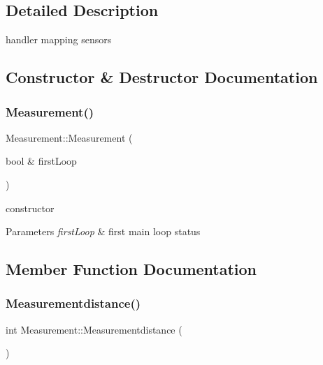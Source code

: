 \subsection{Detailed Description}
handler mapping sensors 

\subsection{Constructor \& Destructor Documentation}
\mbox{\label{class_measurement_a29cccbc8dc4e3148a122b1246c67ac62}} 
\subsubsection{\texorpdfstring{Measurement()}{Measurement()}}
{\footnotesize\ttfamily Measurement\+::\+Measurement (\begin{DoxyParamCaption}\item[{bool \&}]{first\+Loop }\end{DoxyParamCaption})}



constructor 


\begin{DoxyParams}{Parameters}
{\em first\+Loop} & first main loop status \\
\hline
\end{DoxyParams}


\subsection{Member Function Documentation}
\mbox{\label{class_measurement_a38d63e0d0d506ef409b4cf2e7fab8c8a}} 
\subsubsection{\texorpdfstring{Measurementdistance()}{Measurementdistance()}}
{\footnotesize\ttfamily int Measurement\+::\+Measurementdistance (\begin{DoxyParamCaption}{ }\end{DoxyParamCaption})\hspace{0.3cm}{\ttfamily [private]}}



